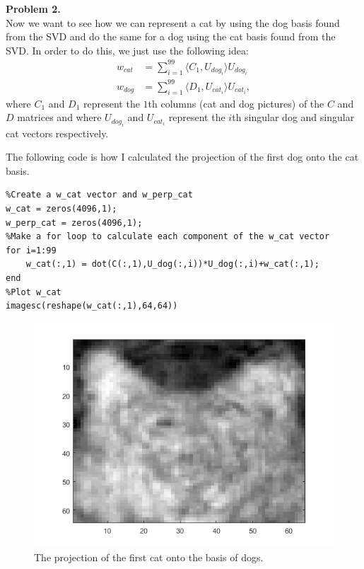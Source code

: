 \documentclass[leqno]{article}
\theoremstyle{nonumberplain}
\begin{document}
\pagebreak



\noindent\textbf{Problem 2.} \\
Now we want to see how we can represent a cat by using the dog basis found from the SVD and do the same for a dog using the cat basis found from the SVD.  In order to do this, we just use the following idea:
\begin{align*}
w_{cat}&=\sum_{i=1}^{99} \langle C_1, U_{{dog}_i} \rangle U_{{dog}_i}\\
w_{dog}&=\sum_{i=1}^{99} \langle D_1, U_{{cat}_i} \rangle U_{{cat}_i},
\end{align*}
where $C_1$ and $D_1$ represent the $1$th columns (cat and dog pictures) of the $C$ and $D$ matrices and where $U_{{dog}_i}$ and $U_{{cat}_i}$ represent the $i$th singular dog and singular cat vectors respectively.

The following code is how I calculated the projection of the first dog onto the cat basis.

\begin{lstlisting}
%Create a w_cat vector and w_perp_cat
w_cat = zeros(4096,1);
w_perp_cat = zeros(4096,1);
%Make a for loop to calculate each component of the w_cat vector
for i=1:99
    w_cat(:,1) = dot(C(:,1),U_dog(:,i))*U_dog(:,i)+w_cat(:,1);
end
%Plot w_cat
imagesc(reshape(w_cat(:,1),64,64))
\end{lstlisting}

\begin{figure}[h]
\begin{center}
\includegraphics[scale=.4]{w_cat.png}
\caption{The projection of the first cat onto the basis of dogs.}
\end{center}
\end{figure}
\end{document}
